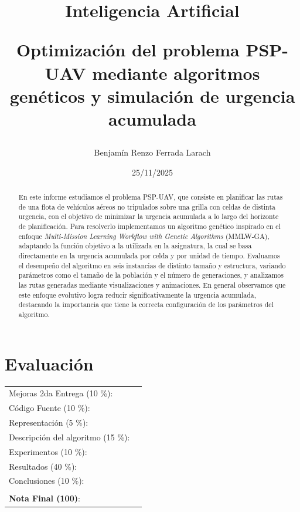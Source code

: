 \documentclass[11pt,a4paper]{article}
\title{Inteligencia Artificial \\ \begin{Large} Optimización del problema PSP-UAV mediante algoritmos genéticos y simulación de urgencia acumulada\end{Large}}
\author{Benjamín Renzo Ferrada Larach}
\date{25/11/2025}
\begin{document}
\maketitle

\section*{Evaluaci\'on}

\begin{tabular}{ll}
Mejoras 2da Entrega (10 \%): &  \underline{\hspace{2cm}}\\
C\'odigo Fuente (10 \%): &  \underline{\hspace{2cm}}\\
Representaci\'on (5 \%):  & \underline{\hspace{2cm}} \\
Descripci\'on del algoritmo (15 \%):  & \underline{\hspace{2cm}} \\
Experimentos (10 \%):  & \underline{\hspace{2cm}} \\
Resultados (40 \%):  & \underline{\hspace{2cm}} \\
Conclusiones (10 \%): &  \underline{\hspace{2cm}}\\
 &  \\
\textbf{Nota Final (100)}:   & \underline{\hspace{2cm}}
\end{tabular}

\begin{abstract}
\noindent
En este informe estudiamos el problema PSP-UAV, que consiste en planificar las rutas de una flota de vehículos aéreos no tripulados sobre una grilla con celdas de distinta urgencia, con el objetivo de minimizar la urgencia acumulada a lo largo del horizonte de planificación. Para resolverlo implementamos un algoritmo genético inspirado en el enfoque \emph{Multi-Mission Learning Workflow with Genetic Algorithms} (MMLW-GA), adaptando la función objetivo a la utilizada en la asignatura, la cual se basa directamente en la urgencia acumulada por celda y por unidad de tiempo. Evaluamos el desempeño del algoritmo en seis instancias de distinto tamaño y estructura, variando parámetros como el tamaño de la población y el número de generaciones, y analizamos las rutas generadas mediante visualizaciones y animaciones. En general observamos que este enfoque evolutivo logra reducir significativamente la urgencia acumulada, destacando la importancia que tiene la correcta configuración de los parámetros del algoritmo.
\end{abstract}
\end{document}
